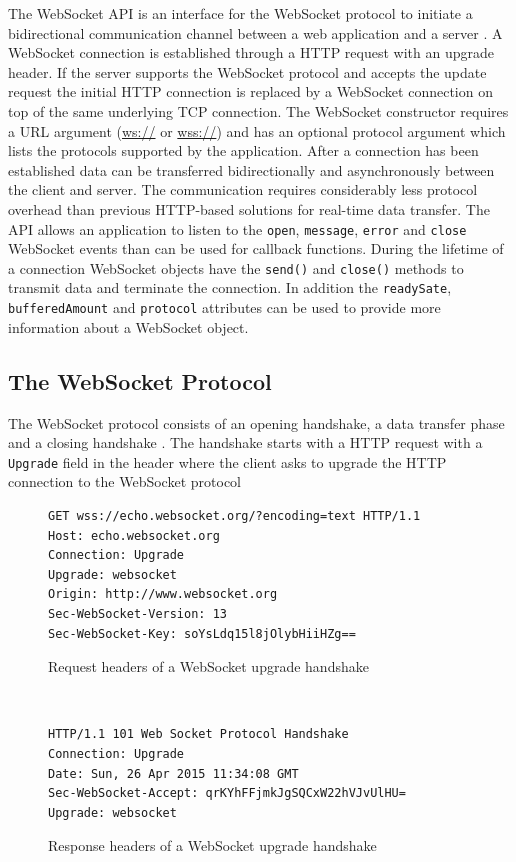 The WebSocket API is an interface for the WebSocket protocol to initiate a bidirectional communication channel between a web application and a server \cite{hickson2011websocket}. A WebSocket connection is established through a HTTP request with an upgrade header. If the server supports the WebSocket protocol and accepts the update request the initial HTTP connection is replaced by a WebSocket connection on top of the same underlying TCP connection. The WebSocket constructor requires a URL argument (\url{ws://} or \url{wss://}) and has an optional protocol argument which lists the protocols supported by the application. After a connection has been established data can be transferred bidirectionally and asynchronously between the client and server. The communication requires considerably less protocol overhead than previous HTTP-based solutions for real-time data transfer. The API allows an application to listen to the \texttt{open}, \texttt{message}, \texttt{error} and \texttt{close} WebSocket events than can be used for callback functions. During the lifetime of a connection WebSocket objects have the \texttt{send()} and \texttt{close()} methods to transmit data and terminate the connection. In addition the \texttt{readySate}, \texttt{bufferedAmount} and \texttt{protocol} attributes can be used to provide more information about a WebSocket object. 

\subsection{The WebSocket Protocol}

The WebSocket protocol consists of an opening handshake, a data transfer phase and a closing handshake \cite{fette2011websocket}. The handshake starts with a HTTP request with a \texttt{Upgrade} field in the header where the client asks to upgrade the HTTP connection to the WebSocket protocol
\\
\begin{figure}[h!]
\begin{verbatim}
GET wss://echo.websocket.org/?encoding=text HTTP/1.1
Host: echo.websocket.org
Connection: Upgrade
Upgrade: websocket
Origin: http://www.websocket.org
Sec-WebSocket-Version: 13
Sec-WebSocket-Key: soYsLdq15l8jOlybHiiHZg==
\end{verbatim}
\caption{Request headers of a WebSocket upgrade handshake}
\label{request-headers}
\end{figure}
\ \\
\begin{figure}[h!]
\begin{verbatim}
HTTP/1.1 101 Web Socket Protocol Handshake
Connection: Upgrade
Date: Sun, 26 Apr 2015 11:34:08 GMT
Sec-WebSocket-Accept: qrKYhFFjmkJgSQCxW22hVJvUlHU=
Upgrade: websocket
\end{verbatim}
\caption{Response headers of a WebSocket upgrade handshake}
\label{response-headers}
\end{figure}

